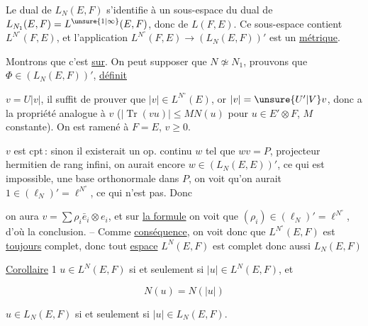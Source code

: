 Le dual de $L_N(E,F)$ s'identifie à un sous-espace du dual de \uline{$L_{N_1}(E,F)=L^{\unsure{1|\infty}}(E,F)$}, donc de $L(F,E)$. \margin{\textcolor{red}{$\vert$}} Ce sous-espace contient $L^{N^\circ}(F,E)$, et l'application $L^{N^\circ}(F,E)\to(L_N(E,F))'$ est un  \uline{métrique}.

Montrons que c'est \uline{sur}. On peut supposer que $N\not\simeq N_1$, prouvons que   $\Phi\in(L_N(E,F))'$, \uline{définit}  

$v=U|v|$, il suffit de prouver que $|v|\in L^{N^\circ}(E)$, or $|v|=\unsure{U'|V}v$, donc a la  propriété analogue à $v$ ($|\operatorname{Tr}(vu)|\leq M N(u)$ pour $u\in E'\otimes F$, $M$ constante). On est ramené à $F=E$, $v\geq 0$.

$v$ est cpt\,: sinon il existerait un op. continu $w$ tel que  $wv=P$, projecteur hermitien de rang infini,  on aurait encore $w\in(L_N(E,E))'$, ce qui est impossible,   une base orthonormale dans $P$, on voit qu'on aurait  $1\in(\ell_N)'=\ell^{N^\circ}$, ce qui n'est pas. Donc


on aura $v=\sum\rho_i\bar e_i\otimes e_i$, et sur \uline{la  formule} on voit que $(\rho_i)\in(\ell_N)'=\ell^{N^\circ}$, d'où la conclusion. -- Comme \uline{conséquence}, on voit donc que $L^{N^\circ}(E,F)$ est \uline{toujours} complet, donc tout \uline{espace} $L^N(E,F)$ est complet donc aussi $L_N(E,F)$




\uline{Corollaire} 1 $u\in L^N(E,F)$ si et seulement si $|u|\in L^N(E,F)$, et

\[
N(u)=N(|u|)
\]

$u\in L_N(E,F)$ si et seulement si $|u|\in L_N(E,F)$.

